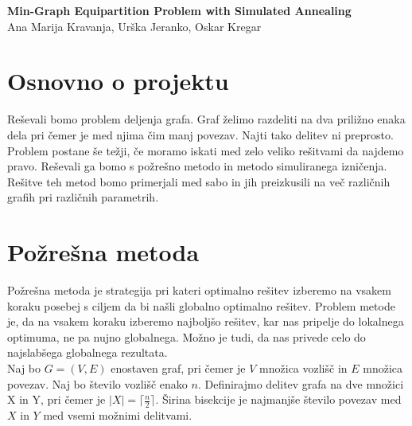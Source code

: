 \documentclass[12pt,a4paper]{amsart}
\theoremstyle{definition} %
\theoremstyle{plain} %
\newcommand{\naslovdela}{Min-Graph Equipartition Problem with Simulated Annealing}
\newcommand{\letnica}{2019}
\begin{document}
\thispagestyle{empty}
\vfill

\begin{center}{\large
{\bf \naslovdela}\\[10mm]
Ana Marija Kravanja, Urška Jeranko, Oskar Kregar}\\[1cm]

\end{center}
\vfill

\noindent{\large
Ljubljana, \letnica}
\pagebreak


\section{Osnovno o projektu}
Reševali bomo problem deljenja grafa. Graf želimo razdeliti na dva priližno enaka dela pri čemer je med njima čim manj povezav. Najti tako delitev ni preprosto. Problem postane še težji, če moramo iskati med zelo veliko rešitvami da najdemo pravo. Reševali ga bomo s požrešno metodo in metodo simuliranega izničenja. Rešitve teh metod bomo primerjali med sabo in jih preizkusili na več različnih grafih pri različnih parametrih. 

\section{Požrešna metoda}
Požrešna metoda je strategija pri kateri optimalno rešitev izberemo na vsakem koraku posebej s ciljem da bi našli globalno optimalno rešitev. Problem metode je, da na vsakem koraku izberemo najboljšo rešitev, kar nas pripelje do lokalnega optimuma, ne pa nujno globalnega. Možno je tudi, da nas privede celo do najslabšega globalnega rezultata. \\

Naj bo $G=(V,E)$ enostaven graf, pri čemer je $V$ množica vozlišč in $E$ množica povezav. Naj bo število vozlišč enako $n$. Definirajmo delitev grafa na dve množici X in Y, pri čemer je $|X| = \lceil \frac{n}{2} \rceil$. Širina bisekcije je najmanjše število povezav med $X$ in $Y$ med vsemi možnimi delitvami. 
\end{document}
